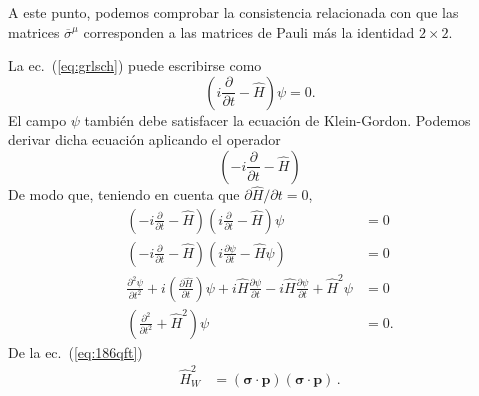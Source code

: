 A este punto, podemos comprobar la consistencia relacionada con que las matrices $\overline{\sigma}^\mu$ corresponden a las matrices de Pauli más la identidad $2\times2$.

\begin{frame}
La ec.~(\ref{eq:grlsch}) puede escribirse como
\begin{equation}
  \left(i\frac{\partial}{\partial t}-\hat{H}\right)\psi=0.
\end{equation}
El campo $\psi$ también debe satisfacer la ecuación de Klein-Gordon. Podemos derivar dicha ecuación aplicando el operador
\begin{equation*}
  \left(-i\frac{\partial}{\partial t}-\hat{H}\right)
\end{equation*}
De modo que, teniendo en cuenta que $\partial\hat H/\partial t=0$,
\begin{align}
  \label{eq:2qftw}
 \left(-i\frac{\partial}{\partial t}-\hat{H}\right)\left(i\frac{\partial}{\partial t}-\hat{H}\right)\psi&=0\nonumber\\
 \left(-i\frac{\partial}{\partial t}-\hat{H}\right)\left(i\frac{\partial\psi}{\partial t}-\hat{H}\psi\right)&=0\nonumber\\
 \frac{\partial^2\psi}{\partial t^2}+i\left(\frac{\partial\hat{H}}{\partial t}\right)\psi
 +i\hat{H}\frac{\partial\psi}{\partial t}-i\hat{H}\frac{\partial\psi}{\partial t}+\hat{H}^2\psi&=0\nonumber\\
 \left(\frac{\partial^2}{\partial t^2}+\hat{H}^2\right)\psi&=0.
\end{align}
% 
De la ec.~(\ref{eq:186qft})
\begin{align}
\label{eq:106qft}
\hat{H}^2_W&=(\boldsymbol\sigma\cdot\boldsymbol{p})(\boldsymbol\sigma\cdot\boldsymbol{p})\,.
\end{align}
\end{frame}

